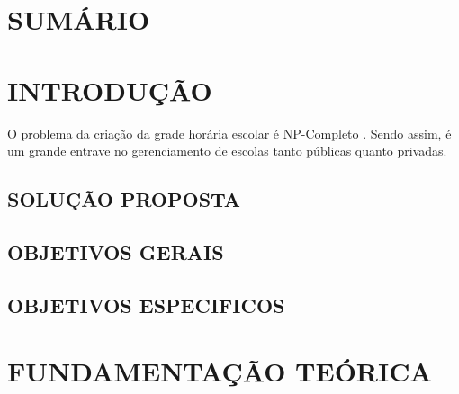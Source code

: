 \documentclass[12pt,a4paper]{article}
\begin{document}
	\section*{SUMÁRIO}

	\begingroup
		\let\clearpage\relax
		\vspace{-1cm} %
		\tableofcontents
	\endgroup

	\newpage


	\section{INTRODUÇÃO}

		O problema da criação da grade horária escolar é NP-Completo \cite{complexity}. Sendo assim, é um grande entrave no gerenciamento de escolas tanto públicas quanto privadas.

		\subsection{SOLUÇÃO PROPOSTA}

			\lipsum[1]


		\subsection{OBJETIVOS GERAIS}

			\lipsum[1]


		\subsection{OBJETIVOS ESPECIFICOS}

			\lipsum[1]

	\newpage


	\section{FUNDAMENTAÇÃO TEÓRICA}
\end{document}
